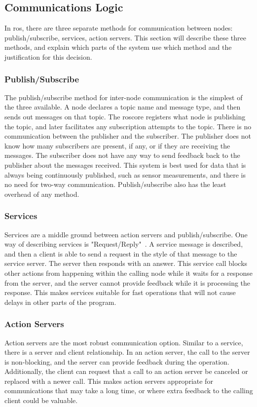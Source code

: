 \documentclass[thesis.tex]{subfile}
\begin{document}
\subsection{Communications Logic}
In \gls{ros}, there are three separate methods for communication between nodes: publish/subscribe, services, action servers. This section will describe these three methods, and explain which parts of the system use which method and the justification for this decision.

\subsubsection{Publish/Subscribe}
The publish/subscribe method for inter-node communication is the simplest of the three available. A node declares a topic name and message type, and then sends out messages on that topic. The \gls{roscore} registers what node is publishing the topic, and later facilitates any subscription attempts to the topic. There is no communication between the publisher and the subscriber. The publisher does not know how many subscribers are present, if any, or if they are receiving the messages. The subscriber does not have any way to send feedback back to the publisher about the messages received. This system is best used for data that is always being continuously published, such as sensor measurements, and there is no need for two-way communication. Publish/subscribe also has the least overhead of any method.

\subsubsection{Services}
Services are a middle ground between action servers and publish/subscribe. One way of describing services is "Request/Reply"~\cite{RosServices}. A service message is described, and then a client is able to send a request in the style of that message to the service server. The server then responds with an answer. This service call blocks other actions from happening within the calling node while it waits for a response from the server, and the server cannot provide feedback while it is processing the response. This makes services suitable for fast operations that will not cause delays in other parts of the program.

\subsubsection{Action Servers}
Action servers are the most robust communication option. Similar to a service, there is a server and client relationship. In an action server, the call to the server is non-blocking, and the server can provide feedback during the operation. Additionally, the client can request that a call to an action server be canceled or replaced with a newer call. This makes action servers appropriate for communications that may take a long time, or where extra feedback to the calling client could be valuable.
\end{document}

